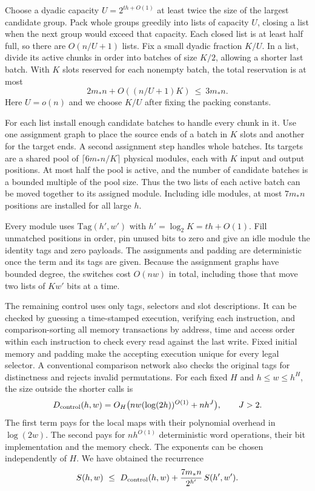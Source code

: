 Choose a dyadic capacity $U=2^{th+O(1)}$ at least twice the size of
the largest candidate group. Pack whole groups greedily into lists of
capacity $U$, closing a list when the next group would exceed that
capacity. Each closed list is at least half full, so there are
$O(n/U+1)$ lists. Fix a small dyadic fraction $K/U$. In a list,
divide its active chunks in order into batches of size $K/2$, allowing
a shorter last batch. With $K$ slots reserved for each nonempty batch, the total reservation
is at most
\[
             2m_*n+O((n/U+1)K)\ \le\ 3m_*n .
\]
Here $U=o(n)$ and we choose $K/U$ after fixing the packing constants.

For each list install enough candidate batches to handle every chunk
in it. Use one assignment graph to place the source ends of a batch in
$K$ slots and another for the target ends. A second assignment step
handles whole batches. Its targets are a shared pool of
$\lceil6m_*n/K\rceil$ physical modules, each with $K$ input and output
positions. At most half the pool is active, and the number of candidate
batches is a bounded multiple of the pool size. Thus the two lists of
each active batch can be moved together to its assigned module.
Including idle modules, at most $7m_*n$ positions are installed for
all large $h$.

Every module uses $\mathrm{Tag}(h',w')$ with $h'=\log_2 K=th+O(1)$.
Fill unmatched positions in order, pin unused bits to zero and give
an idle module the identity tags and zero payloads. The assignments
and padding are deterministic once the term and its tags are given.
Because the assignment graphs have bounded degree, the switches cost
$O(nw)$ in total, including those that move two lists of $Kw'$ bits
at a time.

The remaining control uses only tags, selectors and slot descriptions.
It can be checked by guessing a time-stamped execution, verifying each
instruction, and comparison-sorting all memory transactions by address,
time and access order within each instruction to check every read against the last write. Fixed initial
memory and padding make the accepting execution unique for every legal
selector. A conventional comparison network also checks the original
tags for distinctness and rejects invalid permutations. For each fixed
$H$ and $h\le w\le h^H$, the size outside the shorter calls is
\begin{equation}
  D_{\rm control}(h,w)=
  O_H\bigl(nw(\log(2h))^{O(1)}+n h^J\bigr),\qquad J>2 .
  \label{eq:sort-control}
\end{equation}
The first term pays for the local maps with their polynomial overhead
in $\log(2w)$. The second pays for $nh^{O(1)}$ deterministic word
operations, their bit implementation and the memory check. The
exponents can be chosen independently of $H$. We have obtained the
recurrence
\[
 S(h,w)\ \le\ D_{\rm control}(h,w)
       +\frac{7m_*n}{2^{h'}}\,S(h',w').
\]

